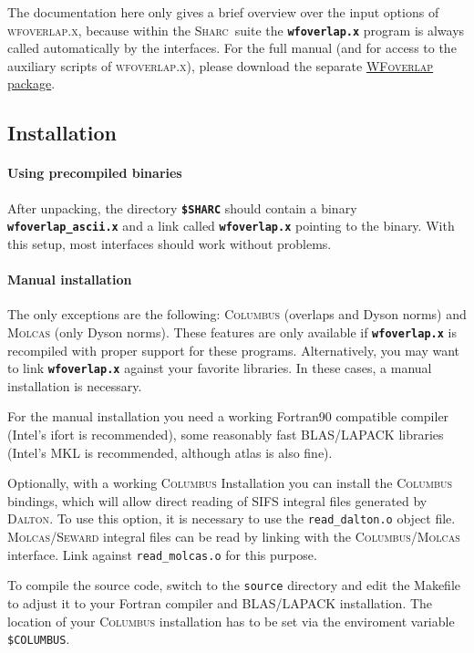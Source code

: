 \documentclass[a4paper,10pt,DIV=15,openany]{scrbook}
\newcommand{\link}[2]{\href{#1}{#2}}
\newcommand{\sharc}{\textsc{Sharc}}
\newcommand{\ttt}[1]{\textbf{\texttt{#1}}}
\begin{document}
The documentation here only gives a brief overview over the input options of \textsc{wfoverlap.x}, because within the \sharc\ suite the \ttt{wfoverlap.x} program is always called automatically by the interfaces. For the full manual (and for access to the auxiliary scripts of \textsc{wfoverlap.x}), please download the separate \link{https://sharc-md.org/?page_id=309}{\textsc{WFoverlap} package}.


\subsection{Installation}

\paragraph{Using precompiled binaries}

After unpacking, the directory \ttt{\$SHARC} should contain a binary \ttt{wfoverlap\_ascii.x} and a link called \ttt{wfoverlap.x} pointing to the binary.
With this setup, most interfaces should work without problems.

\paragraph{Manual installation}

The only exceptions are the following: \textsc{Columbus} (overlaps and Dyson norms) and \textsc{Molcas} (only Dyson norms).
These features are only available if \ttt{wfoverlap.x} is recompiled with proper support for these programs.
Alternatively, you may want to link \ttt{wfoverlap.x} against your favorite libraries.
In these cases, a manual installation is necessary.

For the manual installation you need a working Fortran90 compatible compiler (Intel's ifort is recommended),
some reasonably fast BLAS/LAPACK libraries (Intel's MKL is recommended, although atlas is also fine).

Optionally, with a working \textsc{Columbus} Installation you can install the \textsc{Columbus} bindings, which will
allow direct reading of SIFS integral files generated by \textsc{Dalton}. To use this option, it is
necessary to use the \verb|read_dalton.o| object file.
\textsc{Molcas/Seward} integral files can be read by linking with the \textsc{Columbus/Molcas} interface. Link against
\verb|read_molcas.o| for this purpose.

To compile the source code, switch to the \texttt{source} directory and edit the Makefile to adjust it to your Fortran compiler and BLAS/LAPACK installation. The location of your \textsc{Columbus} installation has to be set via the enviroment variable
\verb|$COLUMBUS|.
\end{document}
